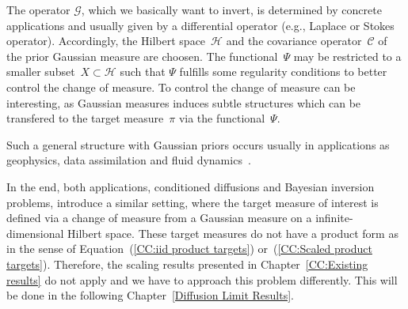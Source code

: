 The operator $\mathcal{G}$, which we basically want to invert, is determined by concrete applications and usually given by a differential operator (e.g., Laplace or Stokes operator). Accordingly, the Hilbert space~$\mathcal{H}$ and the covariance operator~$\mathcal{C}$ of the prior Gaussian measure are choosen. The functional~$\Psi$ may be restricted to a smaller subset~$X \subset \mathcal{H}$ such that $\Psi$ fulfills some regularity conditions to better control the change of measure. To control the change of measure can be interesting, as Gaussian measures induces subtle structures which can be transfered to the target measure~$\pi$ via the functional~$\Psi$.

Such a general structure with Gaussian priors occurs usually in applications as geophysics, data assimilation and fluid dynamics~\autocite{Beskos2009, Dashti2012, Stuart2010}.
\newline

In the end, both applications, conditioned diffusions and Bayesian inversion problems, introduce a similar setting, where the target measure of interest is defined via a change of measure from a Gaussian measure on a infinite-dimensional Hilbert space. These target measures do not have a product form as in the sense of Equation~(\ref{CC:iid product targets}) or~(\ref{CC:Scaled product targets}). Therefore, the scaling results presented in Chapter~\ref{CC:Existing results} do not apply and we have to approach this problem differently. This will be done in the following Chapter~\ref{Diffusion Limit Results}.
